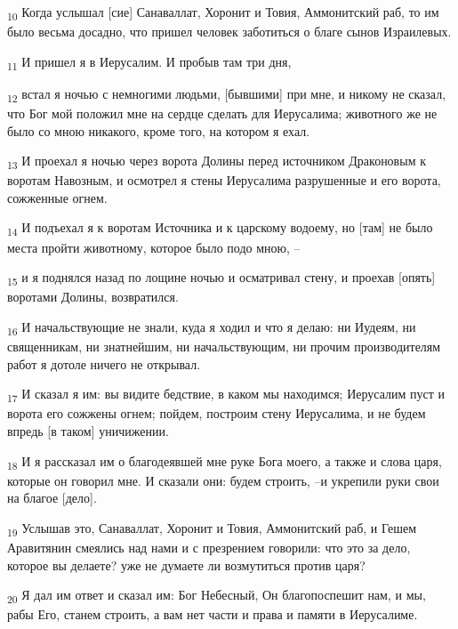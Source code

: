 \begin{tcolorbox}
\textsubscript{10} Когда услышал [сие] Санаваллат, Хоронит и Товия, Аммонитский раб, то им было весьма досадно, что пришел человек заботиться о благе сынов Израилевых.
\end{tcolorbox}
\begin{tcolorbox}
\textsubscript{11} И пришел я в Иерусалим. И пробыв там три дня,
\end{tcolorbox}
\begin{tcolorbox}
\textsubscript{12} встал я ночью с немногими людьми, [бывшими] при мне, и никому не сказал, что Бог мой положил мне на сердце сделать для Иерусалима; животного же не было со мною никакого, кроме того, на котором я ехал.
\end{tcolorbox}
\begin{tcolorbox}
\textsubscript{13} И проехал я ночью через ворота Долины перед источником Драконовым к воротам Навозным, и осмотрел я стены Иерусалима разрушенные и его ворота, сожженные огнем.
\end{tcolorbox}
\begin{tcolorbox}
\textsubscript{14} И подъехал я к воротам Источника и к царскому водоему, но [там] не было места пройти животному, которое было подо мною, --
\end{tcolorbox}
\begin{tcolorbox}
\textsubscript{15} и я поднялся назад по лощине ночью и осматривал стену, и проехав [опять] воротами Долины, возвратился.
\end{tcolorbox}
\begin{tcolorbox}
\textsubscript{16} И начальствующие не знали, куда я ходил и что я делаю: ни Иудеям, ни священникам, ни знатнейшим, ни начальствующим, ни прочим производителям работ я дотоле ничего не открывал.
\end{tcolorbox}
\begin{tcolorbox}
\textsubscript{17} И сказал я им: вы видите бедствие, в каком мы находимся; Иерусалим пуст и ворота его сожжены огнем; пойдем, построим стену Иерусалима, и не будем впредь [в таком] уничижении.
\end{tcolorbox}
\begin{tcolorbox}
\textsubscript{18} И я рассказал им о благодеявшей мне руке Бога моего, а также и слова царя, которые он говорил мне. И сказали они: будем строить, --и укрепили руки свои на благое [дело].
\end{tcolorbox}
\begin{tcolorbox}
\textsubscript{19} Услышав это, Санаваллат, Хоронит и Товия, Аммонитский раб, и Гешем Аравитянин смеялись над нами и с презрением говорили: что это за дело, которое вы делаете? уже не думаете ли возмутиться против царя?
\end{tcolorbox}
\begin{tcolorbox}
\textsubscript{20} Я дал им ответ и сказал им: Бог Небесный, Он благопоспешит нам, и мы, рабы Его, станем строить, а вам нет части и права и памяти в Иерусалиме.
\end{tcolorbox}
